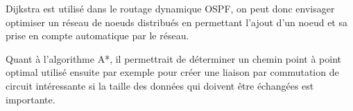 Dijkstra est utilisé dans le routage dynamique OSPF, on peut donc envisager optimiser un réseau
de noeuds distribués en permettant l'ajout d'un noeud et sa prise en compte automatique par le réseau.

Quant à l'algorithme A*, il permettrait de déterminer un chemin point à point optimal utilisé ensuite par exemple pour créer une liaison par commutation de circuit intéressante si la taille des données qui doivent être échangées est importante.








